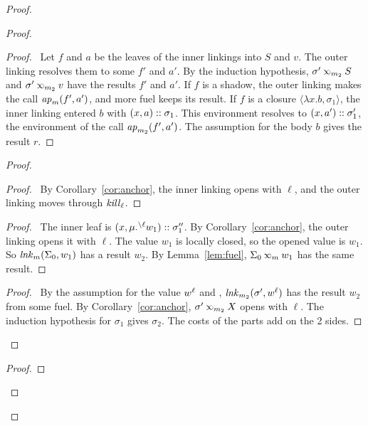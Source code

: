 \begin{proof}
\begin{proof}
    \begin{proof}
      \pf\ Let $f$ and $a$ be the leaves of the inner linkings into $S$ and $v$.
      The outer linking resolves them to some $f'$ and $a'$.
      By the induction hypothesis, $\sigma'\lk{m_2}S$ and $\sigma'\lk{m_2}v$ have the results $f'$ and $a'$.
      If $f$ is a shadow, the outer linking makes the call $\mathit{ap}_{m}(f',a')$, and more fuel keeps its result.
      If $f$ is a closure $\langle\lambda x.b,\sigma_1\rangle$, the inner linking entered $b$ with $(x,a)::\sigma_1$.
      This environment resolves to $(x,a')::\sigma_1'$, the environment of the call $\mathit{ap}_{m_2}(f',a')$.
      The assumption for the body $b$ gives the result $r$.
    \end{proof}
    \begin{proof}
      \begin{proof}
        \pf\ By Corollary~\ref{cor:anchor}, the inner linking opens with $\ell$, and the outer linking moves through $\mathit{kill}_{\ell}$.
      \end{proof}
      \begin{proof}
        \pf\ The inner leaf is $(x,\mu.{\prescript{\backslash{\ell}}{}{w_1}})::\sigma_1''$.
        By Corollary~\ref{cor:anchor}, the outer linking opens it with $\ell$.
        The value $w_1$ is locally closed, so the opened value is $w_1$.
        So $\mathit{lnk}_{m}(\Sigma_0,w_1)$ has a result $w_2$.
        By Lemma~\ref{lem:fuel}, $\Sigma_0\lk{m}w_1$ has the same result.
      \end{proof}
      \qedstep
      \begin{proof}
        \pf\ By the assumption for the value ${w}^{\ell}$ and , $\mathit{lnk}_{m_2}(\sigma',{w}^{\ell})$ has the result $w_2$ from some fuel.
        By Corollary~\ref{cor:anchor}, $\sigma'\lk{m_2}X$ opens with $\ell$.
        The induction hypothesis for $\sigma_1$ gives $\sigma_2$.
        The costs of the parts add on the 2 sides.
      \end{proof}
    \end{proof}
    \qedstep
    \begin{proof}

\end{proof}
\end{proof}
\end{proof}
